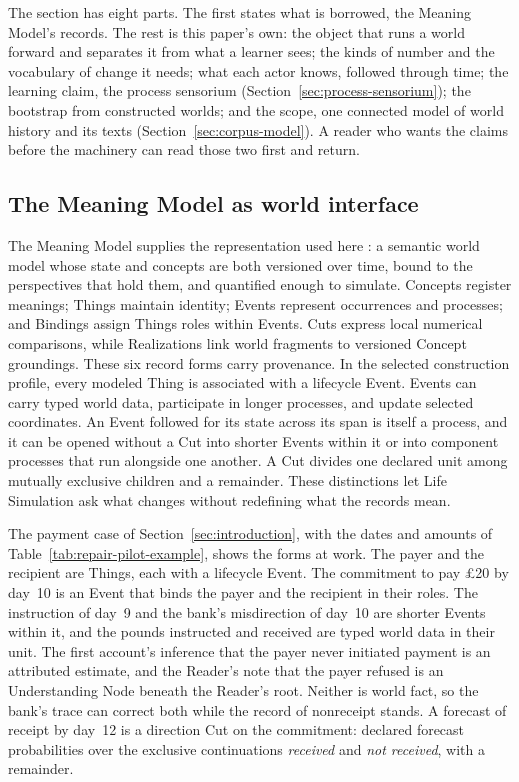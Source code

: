 \documentclass[10pt]{article}
\begin{document}
The section has eight parts. The first states what is borrowed, the Meaning Model's
records. The rest is this paper's own: the object that runs a world forward and
separates it from what a learner sees; the kinds of number and the vocabulary of
change it needs; what each actor knows, followed through time; the learning claim,
the process sensorium (Section~\ref{sec:process-sensorium}); the bootstrap from
constructed worlds; and the scope, one connected model of world history and its
texts (Section~\ref{sec:corpus-model}). A reader who wants the claims before the
machinery can read those two first and return.

\subsection{The Meaning Model as world interface}
\label{sec:meaning-interface}

The Meaning Model supplies the representation used here
\cite{westerbergMeaning2026}: a semantic world model whose state and concepts
are both versioned over time, bound to the perspectives that hold them, and
quantified enough to simulate. Concepts register meanings; Things maintain
identity; Events represent occurrences and processes; and Bindings assign
Things roles within Events. Cuts express local numerical comparisons, while Realizations link world fragments to versioned Concept groundings. These six record forms carry
provenance. In the selected construction profile, every modeled Thing is
associated with a lifecycle Event. Events can carry typed world data, participate in longer
processes, and update selected coordinates. An Event followed for its state across its
span is itself a process, and it can be opened without a Cut into shorter Events within
it or into component processes that run alongside one another. A Cut divides one declared unit
among mutually exclusive children and a remainder. These
distinctions let Life Simulation ask what changes without redefining what the
records mean.

The payment case of Section~\ref{sec:introduction}, with the dates and amounts of
Table~\ref{tab:repair-pilot-example}, shows the forms at work. The payer and the
recipient are Things, each with a lifecycle Event. The commitment to pay
\pounds20 by day~10 is an Event that binds the payer and the recipient in their
roles. The instruction of day~9 and the bank's misdirection of day~10 are shorter
Events within it, and the pounds instructed and received are typed world data in
their unit. The first account's inference that the payer never initiated payment
is an attributed estimate, and the Reader's note that the payer refused is an
Understanding Node beneath the Reader's root. Neither is world fact, so the
bank's trace can correct both while the record of nonreceipt stands. A forecast
of receipt by day~12 is a direction Cut on the commitment: declared forecast
probabilities over the exclusive continuations \emph{received} and \emph{not
received}, with a remainder.
\end{document}
